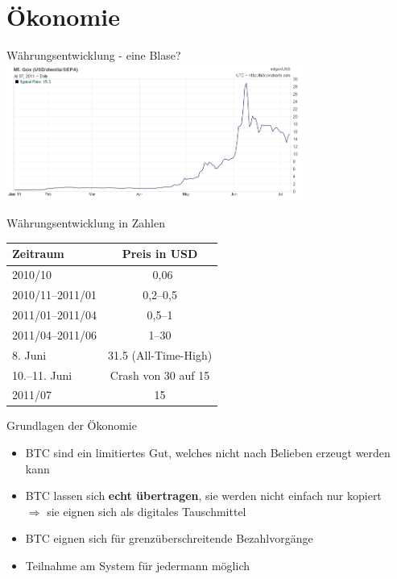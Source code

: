 \documentclass[handout]{beamer} \usepackage[german]{babel}
\begin{document}
\section{Ökonomie}
\begin{frame}{Währungsentwicklung - eine Blase?}
\includegraphics[height=45mm]{btcvortrag/bitcoin-price-mtgox-simple.png}
\end{frame}

\begin{frame}{Währungsentwicklung in Zahlen}
	\begin{tabular}[ht]{l|c}
		\hline
		Zeitraum & Preis in USD \\
		\hline\hline
		2010/10						&	~0,06 \\
		2010/11--2011/01			&	0,2--0,5 \\
		2011/01--2011/04			&	0,5--1 \\
		2011/04--2011/06			&	1--30 \\
		8. Juni						&	31.5 (All-Time-High)\\
		10.--11. Juni				&	Crash von 30 auf 15\\
		2011/07						&	15\\
		\hline
	\end{tabular}
\end{frame}


\begin{frame}
	{Grundlagen der Ökonomie}
	\begin{itemize}
		\item BTC sind ein limitiertes Gut, welches nicht nach Belieben erzeugt
			werden kann\\
		\item BTC lassen sich {\bf echt übertragen}, sie werden nicht einfach nur
			kopiert\\
			$\Rightarrow$ 
			sie eignen sich als digitales Tauschmittel
		\item BTC eignen sich für grenzüberschreitende Bezahlvorgänge
		\item Teilnahme am System für jedermann möglich
	\end{itemize}
\end{frame}
\end{document}
